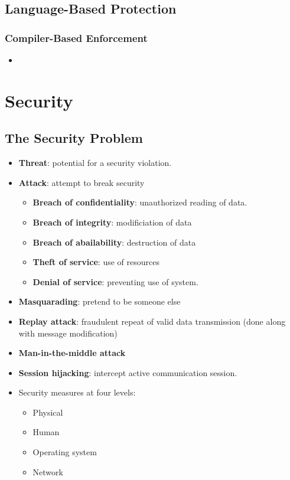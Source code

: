 \documentclass[10pt]{report}
\begin{document}
	\section{Language-Based Protection}
		\subsection{Compiler-Based Enforcement}
			\begin{itemize}
				\item
			\end{itemize}

\chapter{Security} \label{ch:Chapter15}
	\section{The Security Problem}
		\begin{itemize}
			\item \textbf{Threat}: potential for a security violation.
			\item \textbf{Attack}: attempt to break security
			\begin{itemize}
				\item \textbf{Breach of confidentiality}: unauthorized reading of data.
				\item \textbf{Breach of integrity}: modificiation of data
				\item \textbf{Breach of abailability}: destruction of data
				\item \textbf{Theft of service}: use of resources
				\item \textbf{Denial of service}: preventing use of system.
			\end{itemize}
			\item \textbf{Masquarading}: pretend to be someone else
			\item \textbf{Replay attack}: fraudulent repeat of valid data transmission (done along with message modification)
			\item \textbf{Man-in-the-middle attack}
			\item \textbf{Session hijacking}: intercept active communication session.
			\item Security measures at four levels:
			\begin{itemize}
				\item Physical
				\item Human
				\item Operating system
				\item Network
			\end{itemize}
		\end{itemize}
\end{document}
